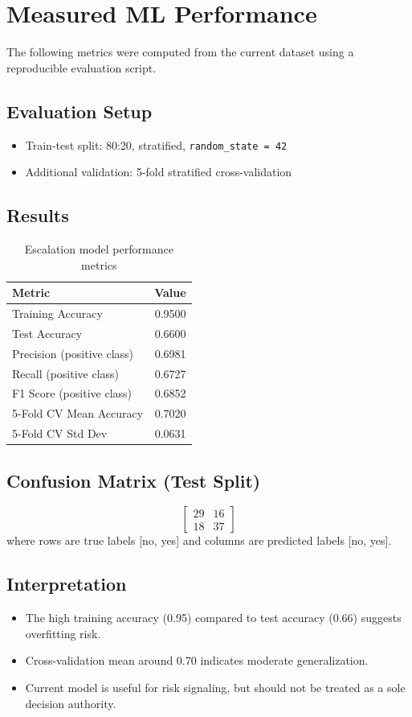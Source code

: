 \documentclass[12pt,a4paper]{article}
\begin{document}
\section{Measured ML Performance}
The following metrics were computed from the current dataset using a reproducible evaluation script.

\subsection{Evaluation Setup}
\begin{itemize}[leftmargin=1.5em]
  \item Train-test split: 80:20, stratified, \texttt{random\_state = 42}
  \item Additional validation: 5-fold stratified cross-validation
\end{itemize}

\subsection{Results}
\begin{table}[h!]
\centering
\begin{tabular}{lr}
\toprule
\textbf{Metric} & \textbf{Value} \\
\midrule
Training Accuracy & 0.9500 \\
Test Accuracy & 0.6600 \\
Precision (positive class) & 0.6981 \\
Recall (positive class) & 0.6727 \\
F1 Score (positive class) & 0.6852 \\
5-Fold CV Mean Accuracy & 0.7020 \\
5-Fold CV Std Dev & 0.0631 \\
\bottomrule
\end{tabular}
\caption{Escalation model performance metrics}
\end{table}

\subsection{Confusion Matrix (Test Split)}
\[
\begin{bmatrix}
29 & 16 \\
18 & 37
\end{bmatrix}
\]
where rows are true labels [no, yes] and columns are predicted labels [no, yes].

\subsection{Interpretation}
\begin{itemize}[leftmargin=1.5em]
  \item The high training accuracy (0.95) compared to test accuracy (0.66) suggests overfitting risk.
  \item Cross-validation mean around 0.70 indicates moderate generalization.
  \item Current model is useful for risk signaling, but should not be treated as a sole decision authority.
\end{itemize}
\end{document}
